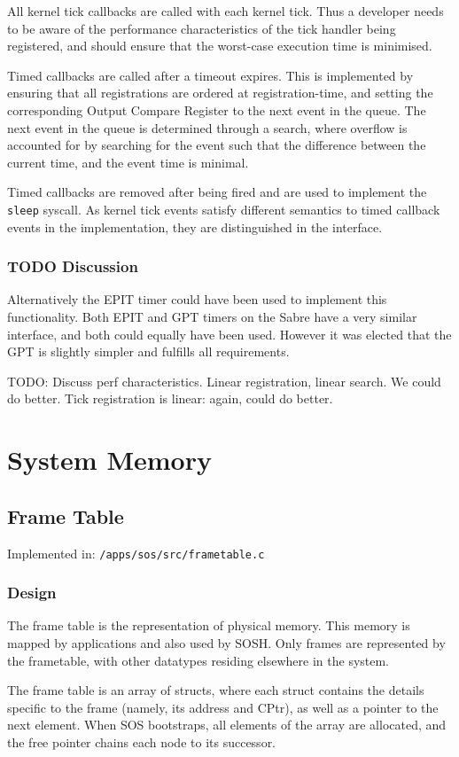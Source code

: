 \documentclass[a4paper,12pt]{article}
\begin{document}
All kernel tick callbacks are called with each kernel tick.  Thus a developer
needs to be aware of the performance characteristics of the tick handler being
registered, and should ensure that the worst-case execution time is minimised.

Timed callbacks are called after a timeout expires.  This is implemented by
ensuring that all registrations are ordered at registration-time, and setting
the corresponding Output Compare Register to the next event in the queue.  The
next event in the queue is determined through a search, where overflow is
accounted for by searching for the event such that the difference between the
current time, and the event time is minimal.

Timed callbacks are removed after being fired and are used to implement the
\texttt{sleep} syscall.  As kernel tick events satisfy different semantics to
timed callback events in the implementation, they are distinguished in the
interface.

\subsubsection{TODO Discussion}
Alternatively the EPIT timer could have been used to implement this
functionality.  Both EPIT and GPT timers on the Sabre have a very similar
interface, and both could equally have been used.  However it was elected that
the GPT is slightly simpler and fulfills all requirements.

TODO: Discuss perf characteristics. Linear registration, linear search.  We
could do better.  Tick registration is linear: again, could do better.

\section{System Memory}
\subsection{Frame Table}
Implemented in: \texttt{/apps/sos/src/frametable.c}
\subsubsection{Design}
The frame table is the representation of physical memory. This memory is
mapped by applications and also used by SOSH.  Only frames are represented by
the frametable, with other datatypes residing elsewhere in the system.

The frame table is an array of structs, where each struct contains the details
specific to the frame (namely, its address and CPtr), as well as a pointer to
the next element.  When SOS bootstraps, all elements of the array are
allocated, and the free pointer chains each node to its successor.
\end{document}
